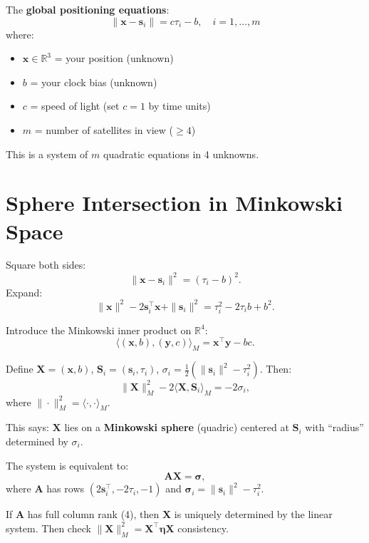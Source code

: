 The \textbf{global positioning equations}:
\[
\|\bm{x} - \bm{s}_i\| = c \tau_i - b, \quad i = 1,\dots,m
\]
where:
\begin{itemize}
    \item $\bm{x} \in \mathbb{R}^3$ = your position (unknown)
    \item $b$ = your clock bias (unknown)
    \item $c$ = speed of light (set $c=1$ by time units)
    \item $m$ = number of satellites in view ($\ge 4$) \cite{boutin2025gps}
\end{itemize}

This is a system of $m$ quadratic equations in 4 unknowns.

\section{Sphere Intersection in Minkowski Space}
\label{sec:gps:minkowski}

Square both sides:
\[
\|\bm{x} - \bm{s}_i\|^2 = (\tau_i - b)^2.
\]
Expand:
\[
\|\bm{x}\|^2 - 2\bm{s}_i^\top\bm{x} + \|\bm{s}_i\|^2 = \tau_i^2 - 2\tau_i b + b^2.
\]

Introduce the Minkowski inner product on $\mathbb{R}^4$:
\[
\langle (\bm{x}, b), (\bm{y}, c) \rangle_M = \bm{x}^\top\bm{y} - bc.
\]

Define $\bm{X} = (\bm{x}, b)$, $\bm{S}_i = (\bm{s}_i, \tau_i)$, $\sigma_i = \frac{1}{2}(\|\bm{s}_i\|^2 - \tau_i^2)$. Then:
\[
\|\bm{X}\|_M^2 - 2\langle \bm{X}, \bm{S}_i \rangle_M = -2\sigma_i,
\]
where $\|\cdot\|_M^2 = \langle \cdot, \cdot \rangle_M$.

This says: $\bm{X}$ lies on a \textbf{Minkowski sphere} (quadric) centered at $\bm{S}_i$ with ``radius'' determined by $\sigma_i$.

\begin{theorem}
The system is equivalent to:
\[
\bm{A} \bm{X} = \bm{\sigma},
\]
where $\bm{A}$ has rows $(2\bm{s}_i^\top, -2\tau_i, -1)$ and $\bm{\sigma}_i = \|\bm{s}_i\|^2 - \tau_i^2$.

If $\bm{A}$ has full column rank (4), then $\bm{X}$ is uniquely determined by the linear system. Then check $\|\bm{X}\|_M^2 = \bm{X}^\top \bm{\eta} \bm{X}$ consistency.
\end{theorem}


